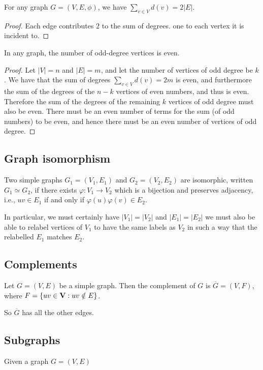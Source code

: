 \documentclass[10pt, a4paper]{article}
\begin{document}
\begin{lemma}
    For any graph $G = (V, E, \phi)$,
    we have $\sum_{v \in V}d(v) = 2|E|$.

    \begin{proof}
        Each edge contributes $2$ to the sum of degrees.
        one to each vertex it is incident to.
    \end{proof}
\end{lemma}

\begin{corollary}
    In any graph,
    the number of odd-degree vertices is even.

    \begin{proof}
        Let $|V| = n$ and $|E| = m$,
        and let the number of vertices of odd degree be $k$.
        We have that the sum of degrees $\sum_{v \in V}d(v) = 2m$ is even,
        and furthermore the sum of the degrees of the $n - k$ vertices of even numbers,
        and thus is even.
        Therefore the sum of the degrees of the remaining $k$ vertices of odd degree must also be even.
        There must be an even number of terms for the sum
        (of odd numbers)
        to be even,
        and hence there must be an even number of vertices of odd degree.
    \end{proof}
\end{corollary}

\subsection{Graph isomorphism}

\begin{definition}
    Two simple graphs $G_1 = (V_1, E_1)$ and $G_2 = (V_2, E_2)$ are isomorphic,
    written $G_1 \simeq G_2$,
    if there exists $\varphi : V_1 \rightarrow V_2$ which is a bijection and preserves adjacency,
    i.e.,
    $uv \in E_1$ if and only if $\varphi(u)\varphi(v) \in E_2$.
\end{definition}

In particular,
we must certainly have $|V_1| = |V_2|$ and $|E_1| = |E_2|$ we must also be able to relabel vertices of $V_1$ to have the same labels as $V_2$ in such a way that the relabelled $E_1$ matches $E_2$.

\subsection{Complements}

\begin{definition}
    Let $G = (V, E)$ be a simple graph.
    Then the complement of $G$ is $\overline{G} = (V, F)$,
    where $F = \{uv \in \mathbf{V} : uv \notin E\}$.

    So $\overline{G}$ has all the other edges.
\end{definition}

\subsection{Subgraphs}

\begin{definition}
    Given a graph $G = (V, E)$
\end{definition}
\end{document}
